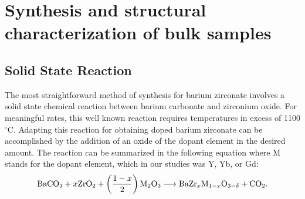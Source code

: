 \vspace{12pt}
\section{Synthesis and structural characterization of bulk samples}


\subsection{Solid State Reaction}

The most straightforward method of synthesis for barium zirconate involves a solid state chemical reaction between barium carbonate and zirconium oxide. For meaningful rates, this well known reaction requires temperatures in excess of 1100$^\circ$C. Adapting this reaction for obtaining  doped barium zirconate can be accomplished by the addition of an oxide of the dopant element in the desired amount. The reaction can be summarized in the following equation where M stands for the dopant element, which in our studies was Y, Yb, or Gd:
\begin{equation}
    \mathrm{BaCO_3 + \text{\ensuremath{x}}ZrO_2 + \left(\frac{1-\it{x}}{2}\right) M_2 O_3 \longrightarrow BaZr_\text{\ensuremath{x}} M_{1-\text{\ensuremath{x}}}O_{3-\delta} + CO_2}.
    \label{meth:equ:ssr}
\end{equation}

